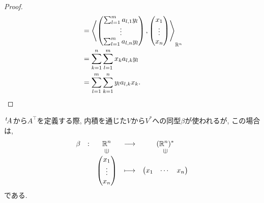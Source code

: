 \begin{proof}
\begin{align*}
    &=\Braket{\begin{pmatrix}\sum_{l=1}^{m}a_{l,1}y_l\\\vdots\\\sum_{l=1}^{m}a_{l,n}y_l\end{pmatrix},\begin{pmatrix}x_1\\\vdots\\x_n\end{pmatrix}}_{\mathbb{R}^n}\\
    &=\sum_{k=1}^n\sum_{l=1}^{m}x_ka_{l,k}y_l\\
    &=\sum_{l=1}^{m}\sum_{k=1}^ny_la_{l,k}x_k.
  \end{align*}
\end{proof}

\begin{remark}
  $\left.^{t}\!A\right.$から$A^\top$を定義する際,
  内積を通じた$V$から$V^\ast$への同型$\beta$が使われるが,
  この場合は,
  \begin{align*}
    \shazo{\beta}
          {\RR^n}{(\RR^n)^\ast}
          {\begin{pmatrix}x_1\\\vdots\\x_n\end{pmatrix}}
          {\begin{pmatrix}x_1&\cdots&x_n\end{pmatrix}}
  \end{align*}
  である.
\end{remark}

